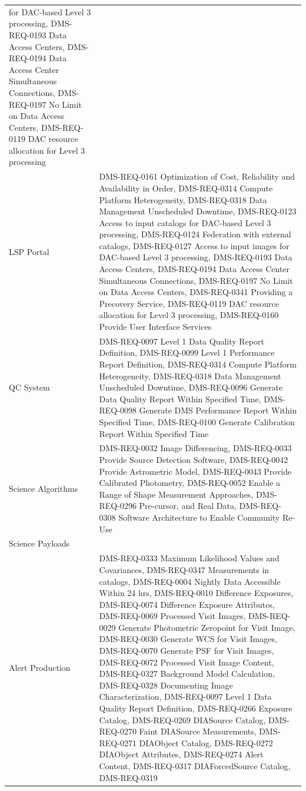 \documentclass[]{article}
\begin{document}
\begin{longtable}[]{@{}ll@{}}
for DAC-based Level 3 processing, DMS-REQ-0193 Data Access Centers,
DMS-REQ-0194 Data Access Center Simultaneous Connections, DMS-REQ-0197
No Limit on Data Access Centers, DMS-REQ-0119 DAC resource allocation
for Level 3 processing\tabularnewline
LSP Portal & DMS-REQ-0161 Optimization of Cost, Reliability and
Availability in Order, DMS-REQ-0314 Compute Platform Heterogeneity,
DMS-REQ-0318 Data Management Unscheduled Downtime, DMS-REQ-0123 Access
to input catalogs for DAC-based Level 3 processing, DMS-REQ-0124
Federation with external catalogs, DMS-REQ-0127 Access to input images
for DAC-based Level 3 processing, DMS-REQ-0193 Data Access Centers,
DMS-REQ-0194 Data Access Center Simultaneous Connections, DMS-REQ-0197
No Limit on Data Access Centers, DMS-REQ-0341 Providing a Precovery
Service, DMS-REQ-0119 DAC resource allocation for Level 3 processing,
DMS-REQ-0160 Provide User Interface Services\tabularnewline
QC System & DMS-REQ-0097 Level 1 Data Quality Report Definition,
DMS-REQ-0099 Level 1 Performance Report Definition, DMS-REQ-0314 Compute
Platform Heterogeneity, DMS-REQ-0318 Data Management Unscheduled
Downtime, DMS-REQ-0096 Generate Data Quality Report Within Specified
Time, DMS-REQ-0098 Generate DMS Performance Report Within Specified
Time, DMS-REQ-0100 Generate Calibration Report Within Specified
Time\tabularnewline
Science Algorithms & DMS-REQ-0032 Image Differencing, DMS-REQ-0033
Provide Source Detection Software, DMS-REQ-0042 Provide Astrometric
Model, DMS-REQ-0043 Provide Calibrated Photometry, DMS-REQ-0052 Enable a
Range of Shape Measurement Approaches, DMS-REQ-0296 Pre-cursor, and Real
Data, DMS-REQ-0308 Software Architecture to Enable Community
Re-Use\tabularnewline
Science Payloads &\tabularnewline
Alert Production & DMS-REQ-0333 Maximum Likelihood Values and
Covariances, DMS-REQ-0347 Measurements in catalogs, DMS-REQ-0004 Nightly
Data Accessible Within 24 hrs, DMS-REQ-0010 Difference Exposures,
DMS-REQ-0074 Difference Exposure Attributes, DMS-REQ-0069 Processed
Visit Images, DMS-REQ-0029 Generate Photometric Zeropoint for Visit
Image, DMS-REQ-0030 Generate WCS for Visit Images, DMS-REQ-0070 Generate
PSF for Visit Images, DMS-REQ-0072 Processed Visit Image Content,
DMS-REQ-0327 Background Model Calculation, DMS-REQ-0328 Documenting
Image Characterization, DMS-REQ-0097 Level 1 Data Quality Report
Definition, DMS-REQ-0266 Exposure Catalog, DMS-REQ-0269 DIASource
Catalog, DMS-REQ-0270 Faint DIASource Measurements, DMS-REQ-0271
DIAObject Catalog, DMS-REQ-0272 DIAObject Attributes, DMS-REQ-0274 Alert
Content, DMS-REQ-0317 DIAForcedSource Catalog, DMS-REQ-0319

\end{longtable}
\end{document}

